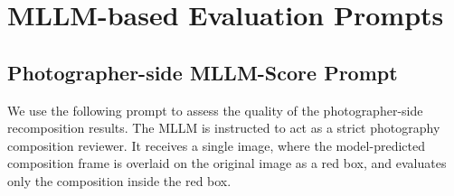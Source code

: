 \documentclass{article} %
\begin{document}
\section{MLLM-based Evaluation Prompts}
\label{app:evaluation_prompts}
\subsection{Photographer-side MLLM-Score Prompt}
\label{app:photographer_mllm_score_prompt}

We use the following prompt to assess the quality of the photographer-side recomposition results. The MLLM is instructed to act as a strict photography composition reviewer. It receives a single image, where the model-predicted composition frame is overlaid on the original image as a red box, and evaluates only the composition inside the red box.
\end{document}
